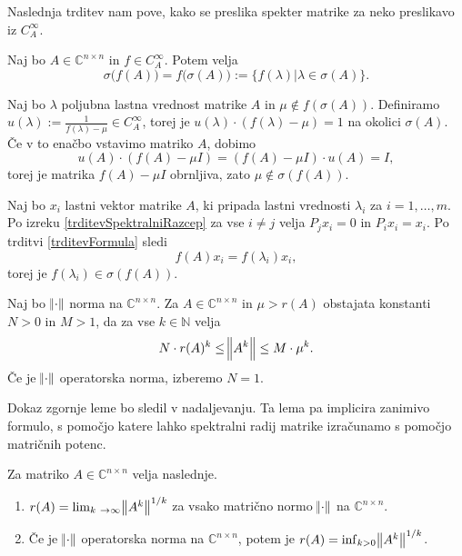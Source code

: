\documentclass[mat1]{fmfdelo}
\newcommand{\N}{\mathbb N}
\newcommand{\C}{\mathbb C}
\begin{document}
Naslednja trditev nam pove, kako se preslika spekter matrike za neko preslikavo iz $C_A^\infty$.
\begin{izrek} \label{izrekOPreslikaviSpektra}
    Naj bo $A \in \C^{n \times n}$ in $f \in C_A^\infty$. Potem velja
    \begin{equation*}
        \sigma\big(f(A)\big) = f\big(\sigma(A)\big) := \{f(\lambda) | \lambda \in \sigma(A)\}.
    \end{equation*}
\end{izrek}
\begin{dokaz}
    Naj bo $\lambda$ poljubna lastna vrednost matrike $A$ in $\mu \notin f(\sigma(A))$. Definiramo $u(\lambda) := \frac{1}{f(\lambda) - \mu} \in C_A^\infty$, torej je $u(\lambda) \cdot (f(\lambda) - \mu) = 1$ na okolici $\sigma(A)$. Če v to enačbo vstavimo matriko $A$, dobimo
    \begin{equation*}
        u(A) \cdot (f(A) - \mu I) = (f(A) - \mu I) \cdot u(A) = I,
    \end{equation*}
    torej je matrika $f(A) - \mu I$ obrnljiva, zato $\mu \notin \sigma(f(A))$.
    
    Naj bo $x_i$ lastni vektor matrike $A$, ki pripada lastni vrednosti $\lambda_i$ za $i = 1, \ldots, m$. Po izreku \ref{trditevSpektralniRazcep} za vse $i \neq j$ velja $P_j x_i = 0$ in $P_i x_i = x_i$. Po trditvi \ref{trditevFormula} sledi
    \begin{equation*}
        f(A) x_i = f(\lambda_i) x_i,
    \end{equation*}
    torej je $f(\lambda_i) \in \sigma(f(A))$.
\end{dokaz}

\begin{lema}\label{lemaNorme}
    Naj bo $\norm{\cdot}$ norma na $\C^{n \times n}$. Za $A \in \C^{n \times n}$ in $\mu > r(A)$ obstajata konstanti $N > 0$ in $M > 1$, da za vse $k \in \N$ velja
    \begin{equation*}\label{eqLemaNorme}
        N \cdot r(A)^k \leq \norm{A^k} \leq M \cdot \mu^k.
    \end{equation*}
    Če je $\norm{\cdot}$ operatorska norma, izberemo $N = 1$.
\end{lema}
Dokaz zgornje leme bo sledil v nadaljevanju. Ta lema pa implicira zanimivo formulo, s pomočjo katere lahko spektralni radij matrike izračunamo s pomočjo matričnih potenc.
\begin{trditev}  \label{gelfand}
    Za matriko $A \in \C^{n \times n}$ velja naslednje.
    \begin{enumerate}
        \item $r(A) = \lim_{k \rightarrow \infty} \norm{A^k}^{1/k}$ za vsako matrično normo $\norm{\cdot}$ na $\C^{n \times n}$.
        \item Če je $\norm{\cdot}$ operatorska norma na $\C^{n \times n}$, potem je $r(A) = \inf_{k > 0} \norm{A^k}^{1/k}$.
    \end{enumerate}
\end{trditev}
\end{document}
